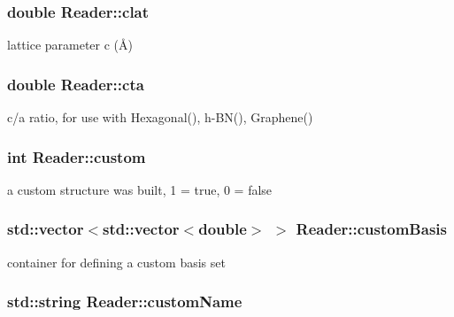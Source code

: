 \subsubsection[{clat}]{\setlength{\rightskip}{0pt plus 5cm}double Reader\+::clat}\label{class_reader_ad10c6e643d5cb651bed0c96790099b51}


lattice parameter c (Å) 

\hypertarget{class_reader_a6eb90d21148a08f9ef4e3dc478917d63}{}
\subsubsection[{cta}]{\setlength{\rightskip}{0pt plus 5cm}double Reader\+::cta}\label{class_reader_a6eb90d21148a08f9ef4e3dc478917d63}


c/a ratio, for use with Hexagonal(), h-\/\+B\+N(), Graphene() 

\hypertarget{class_reader_aeffa187da9ac5feb5c3e5e078fe43fde}{}
\subsubsection[{custom}]{\setlength{\rightskip}{0pt plus 5cm}int Reader\+::custom}\label{class_reader_aeffa187da9ac5feb5c3e5e078fe43fde}


a custom structure was built, 1 = true, 0 = false 

\hypertarget{class_reader_a5f34996abadc7f998ffd1c34c4cfb380}{}
\subsubsection[{custom\+Basis}]{\setlength{\rightskip}{0pt plus 5cm}std\+::vector$<$std\+::vector$<$double$>$ $>$ Reader\+::custom\+Basis}\label{class_reader_a5f34996abadc7f998ffd1c34c4cfb380}


container for defining a custom basis set 

\hypertarget{class_reader_a5cad9d6f8773e4ca9e6ae63b4dd7a307}{}
\subsubsection[{custom\+Name}]{\setlength{\rightskip}{0pt plus 5cm}std\+::string Reader\+::custom\+Name}\label{class_reader_a5cad9d6f8773e4ca9e6ae63b4dd7a307}


